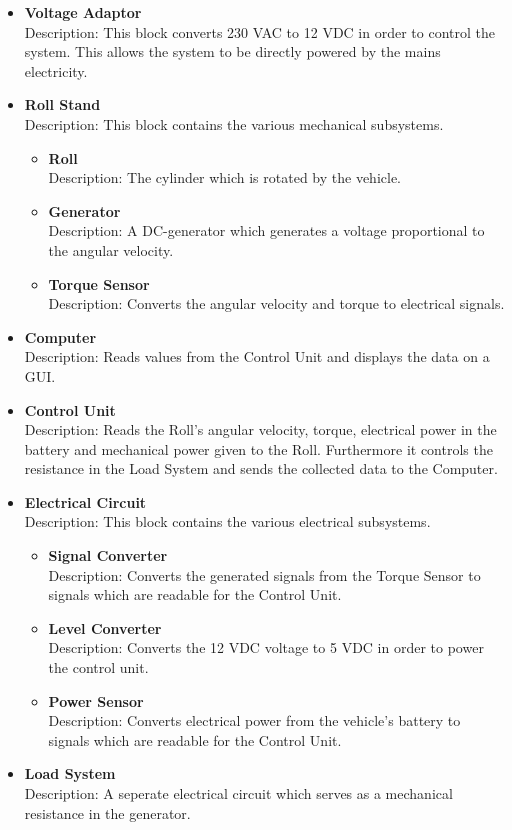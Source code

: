 \begin{itemize}
	\item \textbf{Voltage Adaptor}\\
	Description: This block converts 230 VAC to 12 VDC in order to control the system. This allows the system to be directly powered by the mains electricity.
	\item \textbf{Roll Stand}\\
	Description: This block contains the various mechanical subsystems.
	\begin{itemize}
	   	\item \textbf{Roll}\\
	   	Description: The cylinder which is rotated by the vehicle.
	   	\item \textbf{Generator}\\
	   	Description: A DC-generator which generates a voltage proportional to the angular velocity.
	   	\item \textbf{Torque Sensor}\\
	   	Description: Converts the angular velocity and torque to electrical signals.
	\end{itemize}
	\item \textbf{Computer}\\
	Description: Reads values from the Control Unit and displays the data on a GUI.
	\item \textbf{Control Unit}\\
	Description: Reads the Roll's angular velocity, torque, electrical power in the battery and mechanical power given to the Roll. Furthermore it controls the resistance in the Load System and sends the collected data to the Computer.
	\item \textbf{Electrical Circuit}\\
	Description: This block contains the various electrical subsystems.
	\begin{itemize}
		\item \textbf{Signal Converter}\\
		Description: Converts the generated signals from the Torque Sensor to signals which are readable for the Control Unit.
		\item \textbf{Level Converter}\\
		Description: Converts the 12 VDC voltage to 5 VDC in order to power the control unit.
		\item \textbf{Power Sensor}\\
		Description: Converts electrical power from the vehicle's battery to signals which are readable for the Control Unit.
	\end{itemize}
	\item \textbf{Load System}\\
	Description: A seperate electrical circuit which serves as a mechanical resistance in the generator.
\end{itemize}

